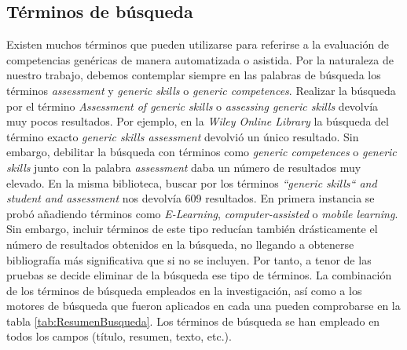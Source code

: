 \subsection{Términos de búsqueda}
\label{sec:TerminosBusqueda}
Existen muchos términos que pueden utilizarse para referirse a la evaluación de competencias genéricas de manera automatizada o asistida. Por la naturaleza de nuestro trabajo, debemos contemplar siempre en las palabras de búsqueda los términos \emph{assessment} y \emph{generic skills} o \emph{generic competences}. Realizar la búsqueda por el término \emph{Assessment of generic skills} o \emph{assessing generic skills} devolvía muy pocos resultados. Por ejemplo, en la \emph{Wiley Online Library} la búsqueda del término exacto \emph{generic skills assessment} devolvió un único resultado. Sin embargo, debilitar la búsqueda con términos como \emph{generic competences} o \emph{generic skills} junto con la palabra \emph{assessment} daba un número de resultados muy elevado. En la misma biblioteca, buscar por los términos \emph{``generic skills`` and student and assessment} nos devolvía 609 resultados. En primera instancia se probó añadiendo términos como  \emph{E-Learning}, \emph{computer-assisted} o \emph{mobile learning}. Sin embargo, incluir términos de este tipo reducían también drásticamente el número de resultados obtenidos en la búsqueda, no llegando a obtenerse bibliografía más significativa que si no se incluyen. Por tanto, a tenor de las pruebas se decide eliminar de la búsqueda ese tipo de términos. La combinación de los términos de búsqueda empleados en la investigación, así como a los motores de búsqueda que fueron aplicados en cada una pueden comprobarse en la tabla \ref{tab:ResumenBusqueda}. Los términos de búsqueda se han empleado en todos los campos (título, resumen, texto, etc.).


